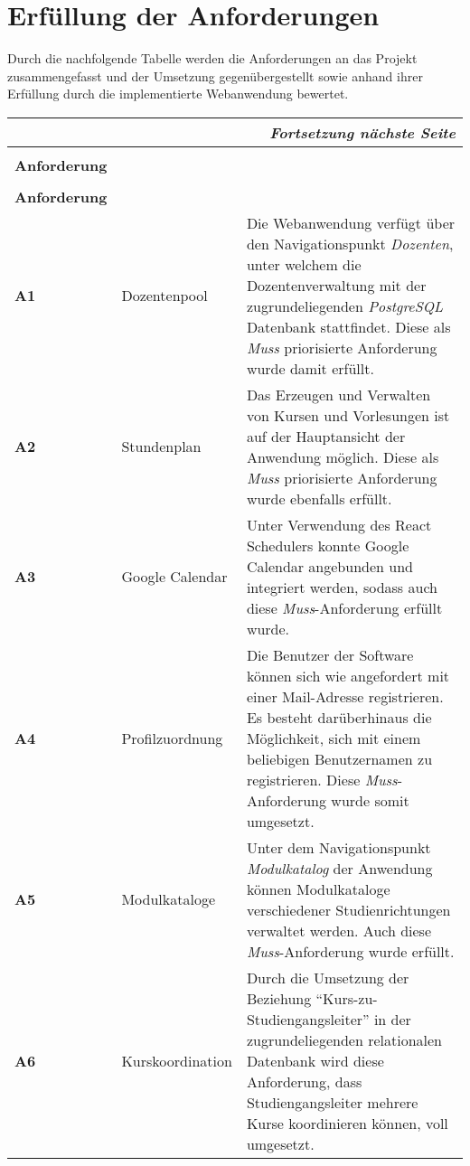 \section{Erfüllung der Anforderungen}
Durch die nachfolgende Tabelle werden die Anforderungen an das Projekt zusammengefasst
und der Umsetzung gegenübergestellt sowie anhand ihrer Erfüllung durch die implementierte Webanwendung bewertet.

\begin{longtable}[H]{|p{}|p{}|p{}|}		
	\multicolumn{3}{|r|}{\textit{Fortsetzung nächste Seite}} \\ \hline
	\endfoot
	\endlastfoot
	\hline &&\\[-0.5em]
	\textbf{Anforderung} & \head{Kurztitel} & \head{Umsetzung} \\ \hline
	\endfirsthead
	\hline &&\\[-0.5em]
	\textbf{Anforderung} & \head{Kurztitel} & \head{Umsetzung} \\ \hline
	\endhead
	\parbox[t]{3cm}{\textbf{A1}} & Dozentenpool & Die Webanwendung verfügt über den Navigationspunkt \textit{Dozenten}, unter welchem die Dozentenverwaltung mit der zugrundeliegenden \textit{PostgreSQL} Datenbank stattfindet. Diese als \textit{Muss} priorisierte Anforderung wurde damit erfüllt.\\ \hline %
	\parbox[t]{3cm}{\textbf{A2}} & Stundenplan &  Das Erzeugen und Verwalten von Kursen und Vorlesungen ist auf der Hauptansicht der Anwendung möglich. Diese als \textit{Muss} priorisierte Anforderung wurde ebenfalls erfüllt.\\ \hline  %
	\parbox[t]{3cm}{\textbf{A3}} & Google Calendar & Unter Verwendung des React Schedulers konnte Google Calendar angebunden und integriert werden, sodass auch diese \textit{Muss}-Anforderung erfüllt wurde. \\ \hline %
	\parbox[t]{3cm}	{\textbf{A4}} & Profilzuordnung & Die Benutzer der Software können sich wie angefordert mit einer Mail-Adresse registrieren. Es besteht darüberhinaus die Möglichkeit, sich mit einem beliebigen Benutzernamen zu registrieren. Diese \textit{Muss}-Anforderung wurde somit umgesetzt.\\ \hline %
	\parbox[t]{3cm}	{\textbf{A5}} & Modulkataloge & Unter dem Navigationspunkt \textit{Modulkatalog} der Anwendung können Modulkataloge verschiedener Studienrichtungen verwaltet werden. Auch diese \textit{Muss}-Anforderung wurde erfüllt.\\ \hline %
	\parbox[t]{3cm}	{\textbf{A6}} & Kurskoordination & Durch die Umsetzung der Beziehung \enquote{Kurs-zu-Studiengangsleiter} in der zugrundeliegenden relationalen Datenbank wird diese Anforderung, dass Studiengangsleiter mehrere Kurse koordinieren können, voll umgesetzt.\\ \hline %

\end{longtable}
